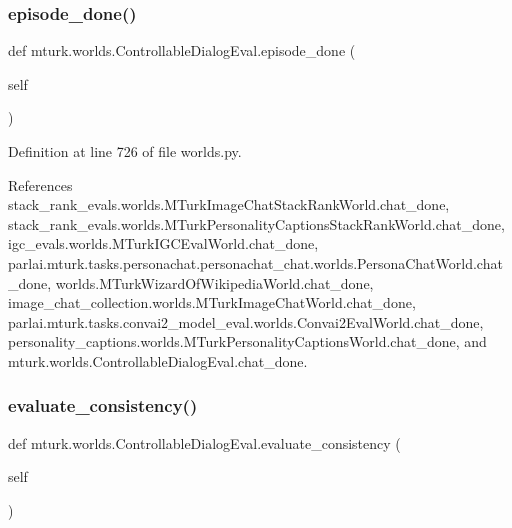 \subsubsection{\texorpdfstring{episode\+\_\+done()}{episode\_done()}}
{\footnotesize\ttfamily def mturk.\+worlds.\+Controllable\+Dialog\+Eval.\+episode\+\_\+done (\begin{DoxyParamCaption}\item[{}]{self }\end{DoxyParamCaption})}



Definition at line 726 of file worlds.\+py.



References stack\+\_\+rank\+\_\+evals.\+worlds.\+M\+Turk\+Image\+Chat\+Stack\+Rank\+World.\+chat\+\_\+done, stack\+\_\+rank\+\_\+evals.\+worlds.\+M\+Turk\+Personality\+Captions\+Stack\+Rank\+World.\+chat\+\_\+done, igc\+\_\+evals.\+worlds.\+M\+Turk\+I\+G\+C\+Eval\+World.\+chat\+\_\+done, parlai.\+mturk.\+tasks.\+personachat.\+personachat\+\_\+chat.\+worlds.\+Persona\+Chat\+World.\+chat\+\_\+done, worlds.\+M\+Turk\+Wizard\+Of\+Wikipedia\+World.\+chat\+\_\+done, image\+\_\+chat\+\_\+collection.\+worlds.\+M\+Turk\+Image\+Chat\+World.\+chat\+\_\+done, parlai.\+mturk.\+tasks.\+convai2\+\_\+model\+\_\+eval.\+worlds.\+Convai2\+Eval\+World.\+chat\+\_\+done, personality\+\_\+captions.\+worlds.\+M\+Turk\+Personality\+Captions\+World.\+chat\+\_\+done, and mturk.\+worlds.\+Controllable\+Dialog\+Eval.\+chat\+\_\+done.

\mbox{\label{classmturk_1_1worlds_1_1ControllableDialogEval_ac91833b4ab4b602e102cef3d7a605536}} 
\subsubsection{\texorpdfstring{evaluate\+\_\+consistency()}{evaluate\_consistency()}}
{\footnotesize\ttfamily def mturk.\+worlds.\+Controllable\+Dialog\+Eval.\+evaluate\+\_\+consistency (\begin{DoxyParamCaption}\item[{}]{self }\end{DoxyParamCaption})}



